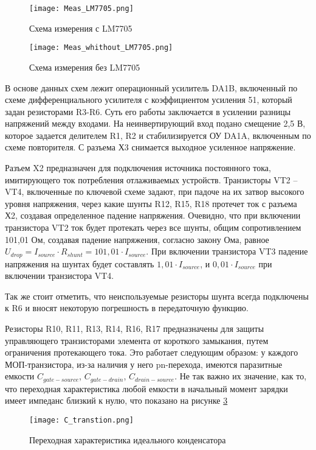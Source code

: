 \begin{figure}[H]
\centering
\texttt{[image: Meas\_LM7705.png]}
\caption{Схема измерения с LM7705}
\label{ris:428}
\end{figure}


\begin{figure}[H]
\centering
\texttt{[image: Meas\_whithout\_LM7705.png]}
\caption{Схема измерения без LM7705}
\label{ris:429}
\end{figure}

В основе данных схем лежит операционный усилитель DA1B, включенный по схеме дифференциального усилителя с 
коэффициентом усиления 51, который задан резисторами R3-R6. Суть его работы заключается в усилении разницы 
напряжений между входами. На неинвертирующий вход подано смещение 2,5 В, которое задается делителем R1, R2 и 
стабилизируется ОУ DA1A, включенным по схеме повторителя. С разъема Х3 снимается выходное усиленное напряжение. 

Разъем X2 предназначен для подключения источника постоянного тока, имитирующего ток потребления отлаживаемых устройств. 
Транзисторы VT2 -- VT4, включенные по ключевой схеме задают, при падоче на их затвор высокого уровня напряжения,
через какие шунты R12, R15, R18 протечет ток с разъема Х2, создавая определенное падение напряжения. 
Очевидно, что при включении транзистора VT2 ток будет протекать через
все шунты, общим сопротивлением 101,01 Ом, создавая падение напряжения, согласно закону Ома, равное 
$U_{drop} = I_{source} \cdot R_{shunt} = 101,01 \cdot I_{source}$. При включении транзистора VT3 падение напряжения
на шунтах будет составлять $1,01 \cdot I_{source}$, и $0,01 \cdot I_{source}$ при включении транзистора VT4.

Так же стоит отметить, что неиспользуемые резисторы шунта всегда подключены к R6 и вносят некоторую погрешность в 
передаточную функцию. 

Резисторы R10, R11, R13, R14, R16, R17 предназначены для защиты управляющего транзисторами элемента от короткого
замыкания, путем ограничения протекающего тока. Это работает следующим образом: у каждого МОП-транзистора, 
из-за наличия у него pn-перехода, имеются
паразитные емкости $C_{gate-source}$, $C_{gate-drain}$, $C_{drain-source}$. Не так важно их значение, как то, что
переходная характеристика любой емкости в начальный момент зарядки имеет импеданс близкий к нулю, что 
показано на рисунке \ref{ris:430}

\begin{figure}[H]
\centering
\texttt{[image: C\_transtion.png]}
\caption{Переходная характеристика идеального конденсатора}
\label{ris:430}
\end{figure}


